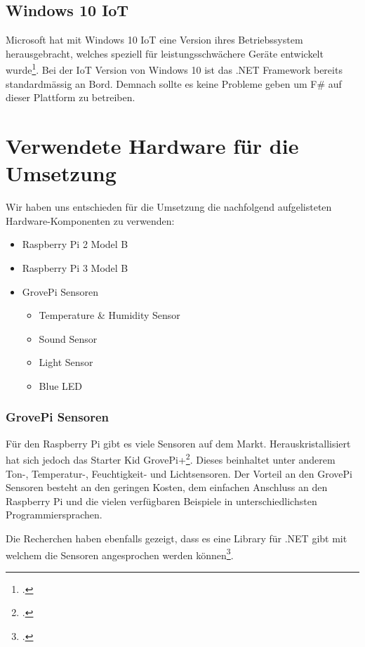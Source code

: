 \subsection{Windows 10 IoT}
Microsoft hat mit Windows 10 IoT eine Version ihres Betriebssystem herausgebracht, welches speziell für leistungsschwächere Geräte entwickelt wurde\footcite{Windows_IoT_2016-04-24}. Bei der IoT Version von Windows 10 ist das .NET Framework bereits standardmässig an Bord. Demnach sollte es keine Probleme geben um F\# auf dieser Plattform zu betreiben.



\section{Verwendete Hardware für die Umsetzung}
Wir haben uns entschieden für die Umsetzung die nachfolgend aufgelisteten Hardware-Komponenten zu verwenden:
\begin{itemize}
\item Raspberry Pi 2 Model B
\item Raspberry Pi 3 Model B
\item GrovePi Sensoren
\begin{itemize}
\item Temperature \& Humidity Sensor
\item Sound Sensor
\item Light Sensor
\item Blue LED
\end{itemize}
\end{itemize}


\subsubsection{GrovePi Sensoren}
Für den Raspberry Pi gibt es viele Sensoren auf dem Markt. Herauskristallisiert hat sich jedoch das Starter Kid GrovePi+\footcite{GrovePi_2016-04-24}. Dieses beinhaltet unter anderem Ton-, Temperatur-, Feuchtigkeit- und Lichtsensoren. Der Vorteil an den GrovePi Sensoren besteht an den geringen Kosten, dem einfachen Anschluss an den Raspberry Pi und die vielen verfügbaren Beispiele in unterschiedlichsten Programmiersprachen.

Die Recherchen haben ebenfalls gezeigt, dass es eine Library für .NET gibt mit welchem die Sensoren angesprochen werden können\footcite{NuGet_GrovePi_2016-04-24}.






